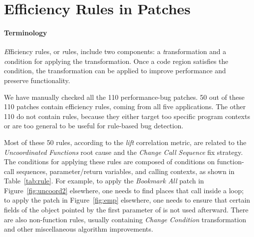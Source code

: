 \section{Efficiency Rules in Patches}

\paragraph{Terminology} {\emph Efficiency rules}, or {\emph rules}, include two 
components: a {\emph transformation} and a {\emph condition} for applying the 
transformation. Once a code region satisfies the condition, 
the transformation can be applied to improve performance and preserve
functionality. 

We have manually checked all the 110 performance-bug patches.
50 out of these 110 patches contain efficiency rules, coming
from all five applications. 
The other 110 do not contain rules, because they
either target too specific program contexts or are too general to be useful
for rule-based bug detection.



Most of these 50 rules, according to the {\it lift} correlation metric,
are related to the {\it Uncoordinated Functions} root cause and the
{\it Change Call Sequence} fix strategy. 
The conditions for applying these rules are composed of
conditions on function-call sequences,
parameter/return variables,
and calling contexts, as shown in Table~\ref{tab:rule}.
For example, to apply the {\it Bookmark All} patch 
in Figure~\ref{fig:uncoord2} elsewhere, one 
needs to find places that call  inside a loop;
to apply the patch in Figure~\ref{fig:emp} elsewhere, one needs to ensure
that certain fields of the object pointed by the first parameter of 
 is not used afterward.
There are also non-function rules, 
usually containing {\it Change Condition} transformation and other
miscellaneous algorithm improvements. 

